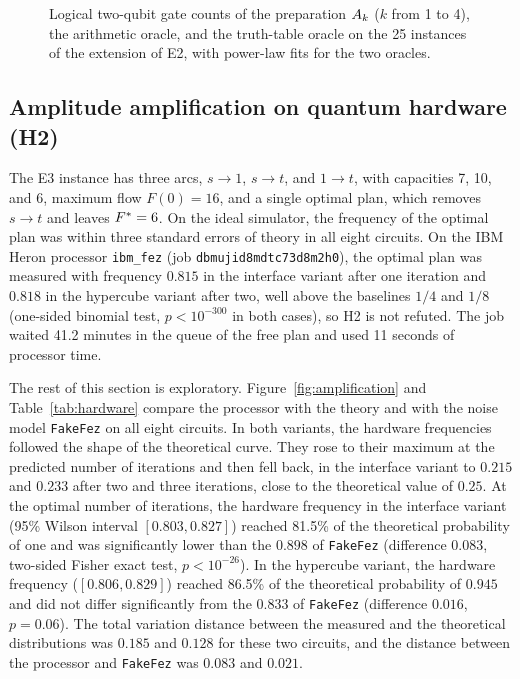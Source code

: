 \begin{figure}[t]
\centering

\caption{Logical two-qubit gate counts of the preparation $A_k$ ($k$ from 1 to 4), the arithmetic oracle, and the truth-table oracle on the 25 instances of the extension of E2, with power-law fits for the two oracles.}\label{fig:resources}
\end{figure}

\subsection{Amplitude amplification on quantum hardware (H2)}\label{sec:results-hardware}
The E3 instance has three arcs, $s\to 1$, $s\to t$, and $1\to t$, with capacities 7, 10, and 6, maximum flow $F(0)=16$, and a single optimal plan, which removes $s\to t$ and leaves $F^{*}=6$. On the ideal simulator, the frequency of the optimal plan was within three standard errors of theory in all eight circuits. On the IBM Heron processor \texttt{ibm\_fez} (job \texttt{dbmujid8mdtc73d8m2h0}), the optimal plan was measured with frequency $0.815$ in the interface variant after one iteration and $0.818$ in the hypercube variant after two, well above the baselines $1/4$ and $1/8$ (one-sided binomial test, $p<10^{-300}$ in both cases), so H2 is not refuted. The job waited 41.2 minutes in the queue of the free plan and used 11 seconds of processor time.

The rest of this section is exploratory. Figure~\ref{fig:amplification} and Table~\ref{tab:hardware} compare the processor with the theory and with the noise model \texttt{FakeFez} on all eight circuits. In both variants, the hardware frequencies followed the shape of the theoretical curve. They rose to their maximum at the predicted number of iterations and then fell back, in the interface variant to $0.215$ and $0.233$ after two and three iterations, close to the theoretical value of $0.25$. At the optimal number of iterations, the hardware frequency in the interface variant (95\% Wilson interval $[0.803,0.827]$) reached 81.5\% of the theoretical probability of one and was significantly lower than the $0.898$ of \texttt{FakeFez} (difference $0.083$, two-sided Fisher exact test, $p<10^{-26}$). In the hypercube variant, the hardware frequency ($[0.806,0.829]$) reached 86.5\% of the theoretical probability of $0.945$ and did not differ significantly from the $0.833$ of \texttt{FakeFez} (difference $0.016$, $p=0.06$). The total variation distance between the measured and the theoretical distributions was $0.185$ and $0.128$ for these two circuits, and the distance between the processor and \texttt{FakeFez} was $0.083$ and $0.021$.

